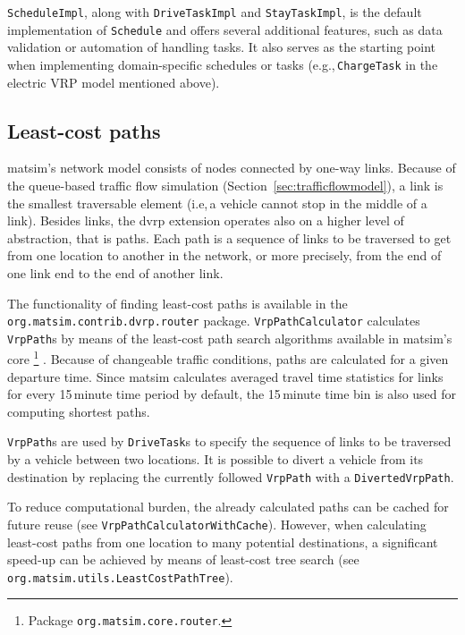 \lstinline$ScheduleImpl$, along with \lstinline$DriveTaskImpl$ and \lstinline$StayTaskImpl$, is the default implementation of \lstinline$Schedule$ and offers several additional features, such as data validation or automation of handling tasks. It also serves as the starting point when implementing domain-specific schedules or tasks (e.g.,\,\lstinline$ChargeTask$ in the electric VRP model mentioned above).

\subsection{Least-cost paths}
\label{sec:VRP-router}

\gls{matsim}'s network model consists of nodes connected by one-way links. Because of the queue-based traffic flow simulation (Section~\ref{sec:trafficflowmodel}), a link is the smallest traversable element (i.e,\,a vehicle cannot stop in the middle of a link). Besides links, the \gls{dvrp} extension operates also on a higher level of abstraction, that is paths. Each path is a sequence of links to be traversed to get from one location to another in the network, or more precisely, from the end of one link end to the end of another link. 

The functionality of finding least-cost paths is available in the \lstinline$org.matsim.contrib.dvrp.router$ package. \lstinline$VrpPathCalculator$ calculates \lstinline$VrpPath$s by means of the least-cost path search algorithms available in \gls{matsim}'s core%
\footnote{
Package \lstinline$org.matsim.core.router$.
}
\citep{JacobMaratheEtAl1999computationalstudyof,LefebvreBalmer2007Fastshortestpath}. Because of changeable traffic conditions, paths are calculated for a given departure time. Since \gls{matsim} calculates averaged travel time statistics for links for every 15\,minute time period by default, the 15\,minute time bin is also used for computing shortest paths.

\lstinline$VrpPath$s are used by \lstinline$DriveTask$s to specify the sequence of links to be traversed by a vehicle between two locations. It is possible to divert a vehicle from its destination by replacing the currently followed \lstinline$VrpPath$ with a \lstinline$DivertedVrpPath$.

To reduce computational burden, the already calculated paths can be cached for future reuse (see \lstinline$VrpPathCalculatorWithCache$). However, when calculating least-cost paths from one location to many potential destinations, a significant speed-up can be achieved by means of least-cost tree search (see \lstinline$org.matsim.utils.LeastCostPathTree$).

